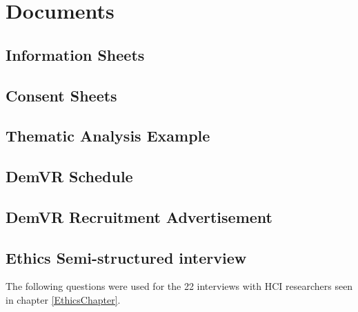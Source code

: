 
\chapter{Documents}

\section{Information Sheets}
\label{app:infoSheets}

\section{Consent Sheets}
\label{app:ConSheets}

\section{Thematic Analysis Example}
\label{app:TA}

\section{DemVR Schedule}
\label{app:DemVRSchedule}

\section{DemVR Recruitment Advertisement}
\label{app:DemVRRecruitment}

\section{Ethics Semi-structured interview}
\label{app:EthicInterview}
The following questions were used for the 22 interviews with HCI researchers seen in chapter \ref{EthicsChapter}.

